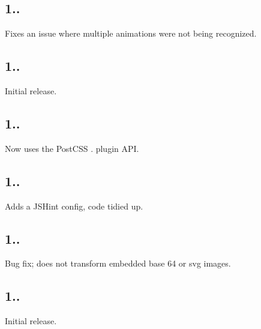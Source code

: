 \subsection*{1..}


\begin{DoxyItemize}
\item Fixes an issue where multiple animations were not being recognized.
\end{DoxyItemize}

\subsection*{1..}


\begin{DoxyItemize}
\item Initial release.
\end{DoxyItemize}

\subsection*{1..}


\begin{DoxyItemize}
\item Now uses the Post\+C\+SS {.} plugin A\+PI.
\end{DoxyItemize}

\subsection*{1..}


\begin{DoxyItemize}
\item Adds a J\+S\+Hint config, code tidied up.
\end{DoxyItemize}

\subsection*{1..}


\begin{DoxyItemize}
\item Bug fix; does not transform embedded base 64 or svg images.
\end{DoxyItemize}

\subsection*{1..}


\begin{DoxyItemize}
\item Initial release. 
\end{DoxyItemize}